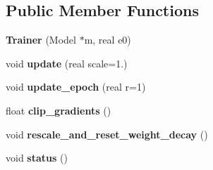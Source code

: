 \subsection*{Public Member Functions}
\begin{DoxyCompactItemize}
\item 
\hypertarget{structdynet_1_1Trainer_aebf069a0e0f27965d3e2c83ee2634fac}{}{\bfseries Trainer} (Model $\ast$m, real e0)\label{structdynet_1_1Trainer_aebf069a0e0f27965d3e2c83ee2634fac}

\item 
\hypertarget{structdynet_1_1Trainer_aeef0722fc13d630e11bb0eb87c1c0022}{}void {\bfseries update} (real scale=1.)\label{structdynet_1_1Trainer_aeef0722fc13d630e11bb0eb87c1c0022}

\item 
\hypertarget{structdynet_1_1Trainer_a2e3ea5a9d5b7ef3b5e6d369b3c5e27b9}{}void {\bfseries update\+\_\+epoch} (real r=1)\label{structdynet_1_1Trainer_a2e3ea5a9d5b7ef3b5e6d369b3c5e27b9}

\item 
\hypertarget{structdynet_1_1Trainer_aded3359afcae9dcea200fc41efe4de05}{}float {\bfseries clip\+\_\+gradients} ()\label{structdynet_1_1Trainer_aded3359afcae9dcea200fc41efe4de05}

\item 
\hypertarget{structdynet_1_1Trainer_a1cf3844683089def105240184f1c4fbc}{}void {\bfseries rescale\+\_\+and\+\_\+reset\+\_\+weight\+\_\+decay} ()\label{structdynet_1_1Trainer_a1cf3844683089def105240184f1c4fbc}

\item 
\hypertarget{structdynet_1_1Trainer_a705582c0d3e884e1f4b35704ec03bb08}{}void {\bfseries status} ()\label{structdynet_1_1Trainer_a705582c0d3e884e1f4b35704ec03bb08}

\end{DoxyCompactItemize}
